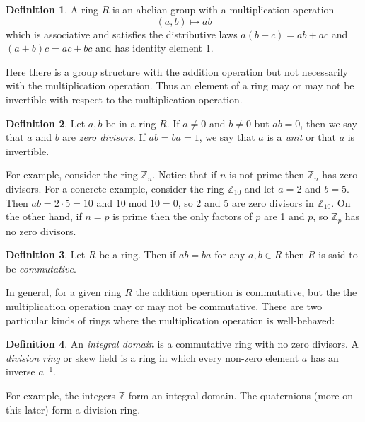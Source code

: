 \documentclass{article}
\theoremstyle{definition}
\newtheorem{definition}{Definition}[section]
\begin{document}
\noindent
\begin{definition}
A ring $R$ is an abelian group with a multiplication operation  
\begin{equation*}
(a, b) \mapsto ab
\end{equation*}
which is associative and satisfies the distributive laws $a(b+c)
= ab+ac$ and $(a+b)c = ac+bc$ and has identity element 1.
\end{definition}

\noindent
Here there is a group structure with the addition operation but
not necessarily with the multiplication operation. Thus an
element of a ring may or may not be invertible with respect to
the multiplication operation.

\begin{definition}
Let $a,b$ be in a ring $R$. If $a \neq 0$ and $b \neq 0$ but $ab
= 0$, then we say that $a$ and $b$ are \emph{zero divisors}. If
$ab = ba = 1$, we say that $a$ is a \emph{unit} or that $a$ is
invertible.
\end{definition}

\noindent
For example, consider the ring $\mathbb{Z}_n$. Notice that if $n$
is not prime then $\mathbb{Z}_n$ has zero divisors. For a
concrete example, consider the ring $\mathbb{Z}_{10}$ and let $a
= 2$ and $b = 5$. Then $ab = 2 \cdot 5 = 10$ and $10 \operatorname{mod} 
10 = 0$, so 2 and 5 are zero divisors in $\mathbb{Z}_{10}$. On the
other hand, if $n = p$ is prime then the only factors of $p$ are
1 and $p$, so $\mathbb{Z}_p$ has no zero divisors.

\begin{definition}
Let $R$ be a ring. Then if $ab = ba$ for any $a,b \in R$ then $R$
is said to be \emph{commutative}. 
\end{definition}

\noindent
In general, for a given ring $R$ the addition operation is
commutative, but the the multiplication operation may or may not
be commutative.  There are two particular kinds of rings where
the multiplication operation is well-behaved:

\begin{definition}
An \emph{integral domain} is a commutative ring with no zero
divisors. A \emph{division ring} or skew field is a ring in which
every non-zero element $a$ has an inverse $a^{-1}$.
\end{definition}

\noindent
For example, the integers $\mathbb{Z}$ form an integral
domain. The quaternions (more on this later) form a division
ring. 
\end{document}
